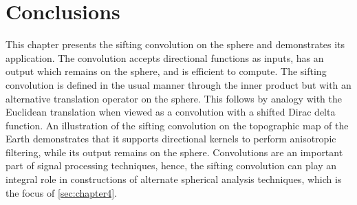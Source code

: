 \section{Conclusions}\label{sec:chapter3_conclusions}

This chapter presents the sifting convolution on the sphere and demonstrates its application.
The convolution accepts directional functions as inputs, has an output which remains on the sphere, and is efficient to compute.
The sifting convolution is defined in the usual manner through the inner product but with an alternative translation operator on the sphere.
This follows by analogy with the Euclidean translation when viewed as a convolution with a shifted Dirac delta function.
An illustration of the sifting convolution on the topographic map of the Earth demonstrates that it supports directional kernels to perform anisotropic filtering, while its output remains on the sphere.
Convolutions are an important part of signal processing techniques, hence, the sifting convolution can play an integral role in constructions of alternate spherical analysis techniques, which is the focus of \cref{sec:chapter4}.
